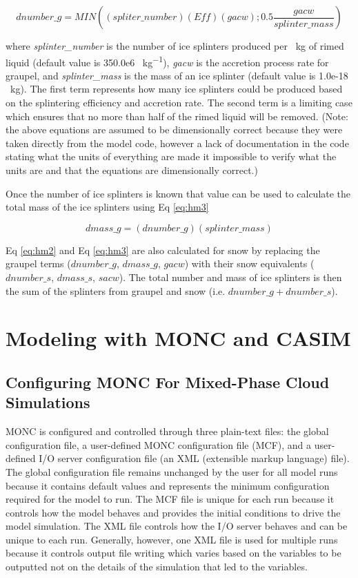 \begin{equation} \label{eq:hm2}
dnumber\_g = MIN\left((spliter\_number)(Eff)(gacw) ; 0.5 \frac{gacw}{splinter\_mass}\right)
\end{equation}

where \textit{splinter\_number} is the number of ice splinters produced per \SI{}{kg} of rimed liquid (default value is 350.0e6 \SI{}{kg^{-1}}), \textit{gacw} is the accretion process rate for graupel, and \textit{splinter\_mass} is the mass of an ice splinter (default value is 1.0e-18 \SI{}{kg}). The first term represents how many ice splinters could be produced based on the splintering efficiency and accretion rate. The second term is a limiting case which ensures that no more than half of the rimed liquid will be removed. (Note: the above equations are assumed to be dimensionally correct because they were taken directly from the model code, however a lack of documentation in the code stating what the units of everything are made it impossible to verify what the units are and that the equations are dimensionally correct.) 

Once the number of ice splinters is known that value can be used to calculate the total mass of the ice splinters using Eq \ref{eq:hm3}

\begin{equation} \label{eq:hm3}
dmass\_g = (dnumber\_g)(splinter\_mass)
\end{equation}

Eq \ref{eq:hm2} and Eq \ref{eq:hm3} are also calculated for snow by replacing the graupel terms ($dnumber\_g$, $dmass\_g$, $gacw$) with their snow equivalents ($dnumber\_s$, $dmass\_s$, $sacw$). The total number and mass of ice splinters is then the sum of the splinters from graupel and snow (i.e. $dnumber\_g + dnumber\_s$). \citep{casimCode}

\chapter{Modeling with MONC and CASIM}
\section{Configuring MONC For Mixed-Phase Cloud Simulations} \label{ch:moncConfig}
MONC is configured and controlled through three plain-text files: the global configuration file, a user-defined MONC configuration file (MCF), and a user-defined I/O server configuration file (an XML (extensible markup language) file). The global configuration file remains unchanged by the user for all model runs because it contains default values and represents the minimum configuration required for the model to run. The MCF file is unique for each run because it controls how the model behaves and provides the initial conditions to drive the model simulation. The XML file controls how the I/O server behaves and can be unique to each run. Generally, however, one XML file is used for multiple runs because it controls output file writing which varies based on the variables to be outputted not on the details of the simulation that led to the variables. 

